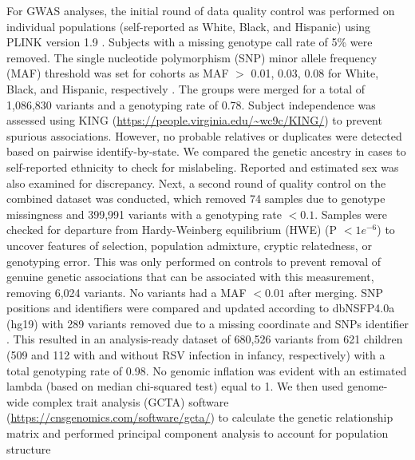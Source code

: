 \documentclass{article} %
\begin{document}
For GWAS analyses, the initial round of data quality control was performed on individual populations (self-reported as White, Black, and  Hispanic) using PLINK version 1.9 
\citep{purcell2007plink}.
Subjects with a missing genotype call rate of 5\% were removed. 
The single nucleotide polymorphism (SNP) minor allele frequency (MAF) threshold was set for cohorts as MAF $> $ 0.01, 0.03, 0.08 for White, Black, and Hispanic, respectively
\citep{liu2016dbnsfp}.
The groups were merged for a total of 1,086,830 variants and a genotyping rate of 0.78. 
Subject independence was assessed using KING (\url{https://people.virginia.edu/~wc9c/KING/}) to prevent spurious associations. 
However, no probable relatives or duplicates were detected based on pairwise identify-by-state. 
We compared the genetic ancestry in cases to self-reported ethnicity to check for mislabeling.
Reported and estimated sex was also examined for discrepancy.
Next, a second round of quality control on the combined dataset was conducted, which removed 74 samples due to genotype missingness and 399,991 variants with a genotyping rate $< 0.1$. 
Samples were checked for departure from Hardy-Weinberg equilibrium (HWE) (P $< 1e^{-6}$) to uncover features of selection, population admixture, cryptic relatedness, or genotyping error. 
This was only performed on controls to prevent removal of genuine genetic associations that can be associated with this measurement, removing 6,024 variants. 
No variants had a MAF $< 0.01$ after merging.
SNP positions and identifiers were compared and updated according to dbNSFP4.0a (hg19) with 289 variants removed due to a missing coordinate and SNPs identifier
\citep{liu2016dbnsfp}.
This resulted in an analysis-ready dataset of 680,526 variants from 621 children (509 and 112 with and without RSV infection in infancy, respectively) with a total genotyping rate of 0.98. 
No genomic inflation was evident with an estimated lambda (based on median chi-squared test) equal to 1. 
We then used genome-wide complex trait analysis (GCTA) software (\url{https://cnsgenomics.com/software/gcta/}) to calculate the genetic relationship matrix and performed principal component analysis to account for population structure
\end{document}
